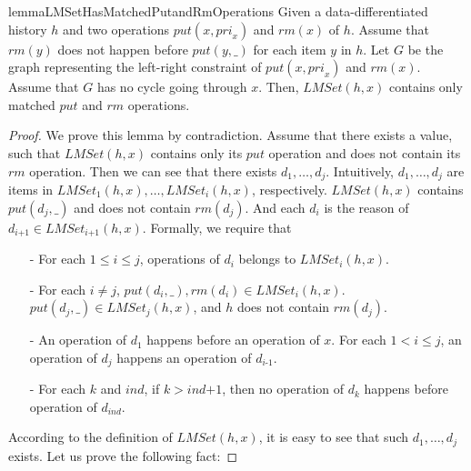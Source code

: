 \documentclass{llncs}
\begin{document}
\begin{restatable}{lemma}{LMSetHasMatchedPutandRmOperations}
\label{lemma:LMSet has matched put and rm operations}
Given a data-differentiated history $h$ and two operations $\textit{put}(x,\textit{pri}_x)$ and $\textit{rm}(x)$ of $h$. Assume that $\textit{rm}(y)$ does not happen before $\textit{put}(y,\_)$ for each item $y$ in $h$. Let $G$ be the graph representing the left-right constraint of $\textit{put}(x,\textit{pri}_x)$ and $\textit{rm}(x)$. Assume that $G$ has no cycle going through $x$. Then, $\textit{LMSet}(h,x)$ contains only matched $\textit{put}$ and $\textit{rm}$ operations.
\end{restatable}
\begin {proof}

We prove this lemma by contradiction. Assume that there exists a value, such that $\textit{LMSet}(h,x)$ contains only its $\textit{put}$ operation and does not contain its $\textit{rm}$ operation. Then we can see that there exists $d_1,\ldots,d_j$. Intuitively, $d_1,\ldots,d_j$ are items in $\textit{LMSet}_1(h,x), \ldots, \textit{LMSet}_i(h,x)$, respectively. $\textit{LMSet}(h,x)$ contains $\textit{put}(d_j,\_)$ and does not contain $\textit{rm}(d_j)$. And each $d_i$ is the reason of $d_{\textit{i+1}} \in \textit{LMSet}_{\textit{i+1}}(h,x)$. Formally, we require that

\begin{itemize}
\setlength{\itemsep}{0.5pt}
\item[-] For each $1 \leq i \leq j$, operations of $d_i$ belongs to $\textit{LMSet}_i(h,x)$. %

\item[-] For each $i \neq j$, $\textit{put}(d_i,\_),\textit{rm}(d_i) \in \textit{LMSet}_i(h,x)$. $\textit{put}(d_j,\_) \in \textit{LMSet}_j(h,x)$, and $h$ does not contain $\textit{rm}(d_j)$.

\item[-] An operation of $d_1$ happens before an operation of $x$. For each $1 < i \leq j$, an operation of $d_j$ happens an operation of $d_{\textit{i-1}}$.

\item[-] For each $k$ and $\textit{ind}$, if $k > \textit{ind+1}$, then no operation of $d_k$ happens before operation of $d_{\textit{ind}}$.
\end{itemize}

According to the definition of $\textit{LMSet}(h,x)$, it is easy to see that such $d_1,\ldots,d_j$ exists. Let us prove the following fact:


\end{proof}
\end{document}
